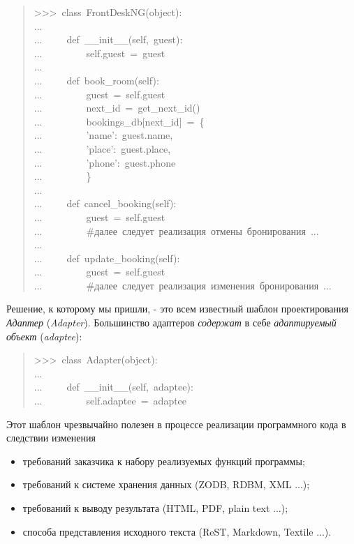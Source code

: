 \documentclass[a4paper,openany,twoside,final]{book}
\begin{document}
\begin{quote}{\ttfamily \raggedright \noindent
>{}>{}>~class~FrontDeskNG(object):\\
...\\
...~~~~~def~\_\_init\_\_(self,~guest):\\
...~~~~~~~~~self.guest~=~guest\\
...\\
...~~~~~def~book\_room(self):\\
...~~~~~~~~~guest~=~self.guest\\
...~~~~~~~~~next\_id~=~get\_next\_id()\\
...~~~~~~~~~bookings\_db{[}next\_id{]}~=~\{\\
...~~~~~~~~~'name':~guest.name,\\
...~~~~~~~~~'place':~guest.place,\\
...~~~~~~~~~'phone':~guest.phone\\
...~~~~~~~~~\}\\
...\\
...~~~~~def~cancel\_booking(self):\\
...~~~~~~~~~guest~=~self.guest\\
...~~~~~~~~~\#далее~следует~реализация~отмены~бронирования~...\\
...\\
...~~~~~def~update\_booking(self):\\
...~~~~~~~~~guest~=~self.guest\\
...~~~~~~~~~\#далее~следует~реализация~изменения~бронирования~...
}
\end{quote}

Решение, к которому мы пришли, - это всем известный шаблон
проектирования \emph{Адаптер} (\emph{Adapter}). Большинство адаптеров \emph{содержат}
в себе \emph{адаптируемый объект} (\emph{adaptee}):

\begin{quote}{\ttfamily \raggedright \noindent
>{}>{}>~class~Adapter(object):\\
...\\
...~~~~~def~\_\_init\_\_(self,~adaptee):\\
...~~~~~~~~~self.adaptee~=~adaptee
}
\end{quote}

Этот шаблон чрезвычайно полезен в процессе реализации программного
кода в следствии изменения

\begin{itemize}

\item требований заказчика к набору реализуемых функций программы;

\item требований к системе хранения данных (ZODB, RDBM, XML ...);

\item требований к выводу результата (HTML, PDF, plain text ...);

\item способа представления исходного текста (ReST, Markdown, Textile
...).

\end{itemize}
\end{document}
